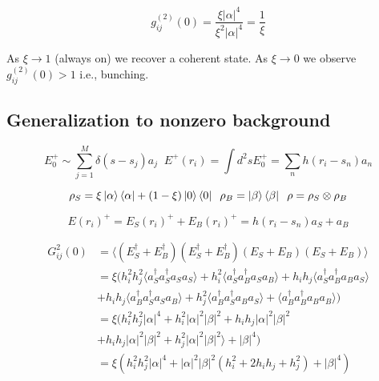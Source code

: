 \begin{equation*}
g^{(2)}_{ij}(0) = \frac{\xi\lvert\alpha\rvert^{4}}{\xi^{2}\lvert\alpha\rvert^{4}} = \frac{1}{\xi}
\end{equation*}

As $\xi\rightarrow 1$ (always on) we recover a coherent state. As $\xi\rightarrow 0$ we observe $g^{(2)}_{ij}(0) > 1$ i.e., bunching.

\subsection{Generalization to nonzero background}

\begin{equation*}
E_{0}^{+}\sim \sum_{j=1}^{M}\delta(s-s_{j})a_{j} \;\; E^{+}(r_{i}) = \int d^{2}s E_{0}^{+} = \sum_{n}h(r_{i}-s_{n})a_{n}
\end{equation*}

\begin{equation*}
\rho_{S} = \xi\ket{\alpha}\bra{\alpha} + (1-\xi)\ket{0}\bra{0}\;\;\rho_{B} = \ket{\beta}\bra{\beta}\;\;\rho = \rho_{S}\otimes\rho_{B}
\end{equation*}

\begin{equation*}
E(r_{i})^{+} = E_{S}(r_{i})^{+} + E_{B}(r_{i})^{+} = h(r_{i}-s_{n})a_{S} + a_{B}
\end{equation*}

\begin{align*}
G^{2}_{ij}(0) &= \langle(E_{S}^{\dagger} + E_{B}^{\dagger}) (E_{S}^{\dagger} + E_{B}^{\dagger})( E_{S} + E_{B}) (E_{S} + E_{B})\rangle \\
&= \xi(h_{i}^{2}h_{j}^{2}\langle a_{S}^{\dagger}a_{S}^{\dagger}a_{S}a_{S}\rangle + h_{i}^{2}\langle a_{S}^{\dagger}a_{B}^{\dagger}a_{S}a_{B}\rangle +  h_{i}h_{j}\langle a_{S}^{\dagger}a_{B}^{\dagger}a_{B}a_{S}\rangle \\
&+ h_{i}h_{j}\langle a_{B}^{\dagger}a_{S}^{\dagger}a_{S}a_{B} \rangle +  h_{j}^{2}\langle a_{B}^{\dagger}a_{S}^{\dagger}a_{B}a_{S}\rangle  + \langle a_{B}^{\dagger}a_{B}^{\dagger}a_{B}a_{B}\rangle ) \\
&= \xi(h_{i}^{2}h_{j}^{2}\lvert\alpha\rvert^{4}+ h_{i}^{2}\lvert\alpha\rvert^{2}\lvert\beta\rvert^{2} +  h_{i}h_{j}\lvert\alpha\rvert^{2}\lvert\beta\rvert^{2} \\
&+ h_{i}h_{j}\lvert\alpha\rvert^{2}\lvert\beta\rvert^{2} +  h_{j}^{2}\lvert\alpha\rvert^{2}\lvert\beta\rvert^{2}\rangle  + \lvert\beta\rvert^{4} ) \\
&= \xi(h_{i}^{2}h_{j}^{2}\lvert\alpha\rvert^{4}+ \lvert\alpha\rvert^{2}\lvert\beta\rvert^{2}(h_{i}^{2} +  2 h_{i}h_{j} + h_{j}^{2})  + \lvert\beta\rvert^{4}) \\
\end{align*}

